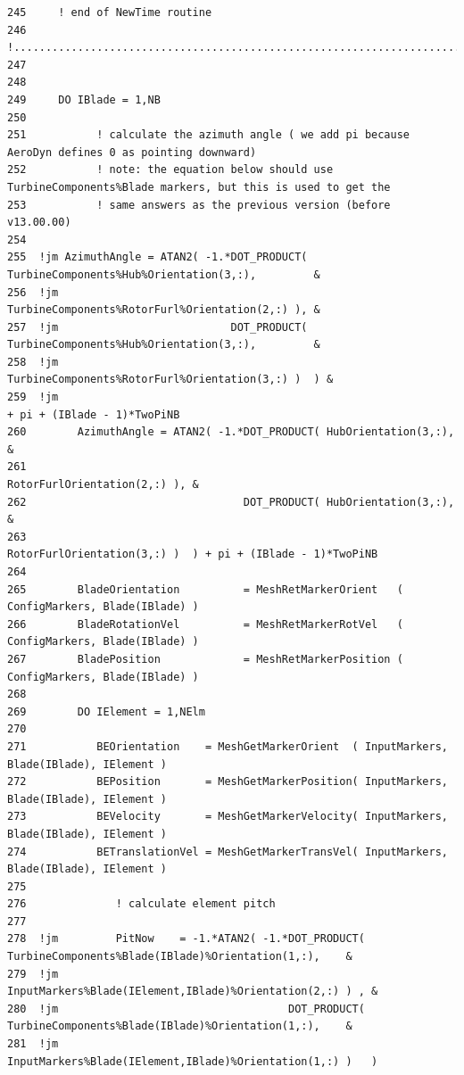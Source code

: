 \documentclass[11pt]{article}
\begin{document}
{\begin{verbatim}
245     ! end of NewTime routine
246     !...........................................................................
247  
248  
249     DO IBlade = 1,NB
250     
251           ! calculate the azimuth angle ( we add pi because AeroDyn defines 0 as pointing downward)
252           ! note: the equation below should use TurbineComponents%Blade markers, but this is used to get the 
253           ! same answers as the previous version (before v13.00.00)                          
254           
255  !jm AzimuthAngle = ATAN2( -1.*DOT_PRODUCT( TurbineComponents%Hub%Orientation(3,:),         & 
256  !jm                                        TurbineComponents%RotorFurl%Orientation(2,:) ), &
257  !jm                           DOT_PRODUCT( TurbineComponents%Hub%Orientation(3,:),         &
258  !jm                                        TurbineComponents%RotorFurl%Orientation(3,:) )  ) &
259  !jm                                                               + pi + (IBlade - 1)*TwoPiNB
260        AzimuthAngle = ATAN2( -1.*DOT_PRODUCT( HubOrientation(3,:),         & 
261                                               RotorFurlOrientation(2,:) ), &
262                                  DOT_PRODUCT( HubOrientation(3,:),         &
263                                               RotorFurlOrientation(3,:) )  ) + pi + (IBlade - 1)*TwoPiNB
264  
265        BladeOrientation          = MeshRetMarkerOrient   ( ConfigMarkers, Blade(IBlade) )
266        BladeRotationVel          = MeshRetMarkerRotVel   ( ConfigMarkers, Blade(IBlade) )
267        BladePosition             = MeshRetMarkerPosition ( ConfigMarkers, Blade(IBlade) )
268  
269        DO IElement = 1,NElm
270  
271           BEOrientation    = MeshGetMarkerOrient  ( InputMarkers, Blade(IBlade), IElement )
272           BEPosition       = MeshGetMarkerPosition( InputMarkers, Blade(IBlade), IElement )
273           BEVelocity       = MeshGetMarkerVelocity( InputMarkers, Blade(IBlade), IElement )
274           BETranslationVel = MeshGetMarkerTransVel( InputMarkers, Blade(IBlade), IElement )
275              
276              ! calculate element pitch
277                                              
278  !jm         PitNow    = -1.*ATAN2( -1.*DOT_PRODUCT( TurbineComponents%Blade(IBlade)%Orientation(1,:),    &
279  !jm                                                 InputMarkers%Blade(IElement,IBlade)%Orientation(2,:) ) , &
280  !jm                                    DOT_PRODUCT( TurbineComponents%Blade(IBlade)%Orientation(1,:),    &
281  !jm                                                 InputMarkers%Blade(IElement,IBlade)%Orientation(1,:) )   )

\end{verbatim}}
\end{document}
